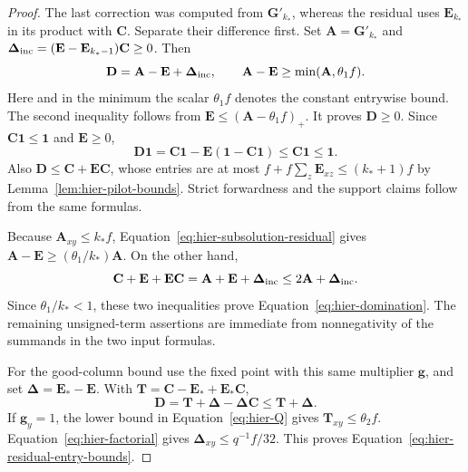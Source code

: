 \documentclass[11pt]{article}
\numberwithin{equation}{section}
\theoremstyle{definition}
\theoremstyle{remark}
\begin{document}
\begin{proof}
The last correction was computed from ${\mathbf{G}}'_{k_*}$, whereas the residual uses ${\mathbf{E}}_{k_*}$ in its product with ${\mathbf{C}}$. Separate their difference first. Set ${\mathbf{A}}={\mathbf{G}}'_{k_*}$ and
$\boldsymbol{\Delta}_{\rm inc}=({\mathbf{E}}-{\mathbf{E}}_{k_*-1}){\mathbf{C}}\geq0$.  Then
\begin{equation}
 {\mathbf{D}}={\mathbf{A}}-{\mathbf{E}}+\boldsymbol{\Delta}_{\rm inc},
 \qquad {\mathbf{A}}-{\mathbf{E}}\geq\min({\mathbf{A}},\theta_1f).
 \label{eq:hier-subsolution-residual}
\end{equation}
Here and in the minimum the scalar $\theta_1f$ denotes the constant
entrywise bound.  The second inequality follows from
${\mathbf{E}}\leq({\mathbf{A}}-\theta_1f)_+$.  It proves ${\mathbf{D}}\geq0$.
Since ${\mathbf{C}}\mathbf 1\leq\mathbf 1$ and ${\mathbf{E}}\geq0$,
\[
 {\mathbf{D}}\mathbf 1={\mathbf{C}}\mathbf 1-{\mathbf{E}}(\mathbf 1-{\mathbf{C}}\mathbf 1)
       \leq {\mathbf{C}}\mathbf 1\leq\mathbf 1.
\]
Also ${\mathbf{D}}\leq {\mathbf{C}}+{\mathbf{E}}{\mathbf{C}}$, whose entries are at most
$f+f\sum_z {\mathbf{E}}_{xz}\leq(k_*+1)f$ by
Lemma~\ref{lem:hier-pilot-bounds}.  Strict forwardness and the support
claims follow from the same formulas.

Because ${\mathbf{A}}_{xy}\leq k_*f$, Equation~\eqref{eq:hier-subsolution-residual}
gives ${\mathbf{A}}-{\mathbf{E}}\geq(\theta_1/k_*){\mathbf{A}}$.  On the other hand,
\[
 {\mathbf{C}}+{\mathbf{E}}+{\mathbf{E}}{\mathbf{C}}={\mathbf{A}}+{\mathbf{E}}+\boldsymbol{\Delta}_{\rm inc}\leq2{\mathbf{A}}+\boldsymbol{\Delta}_{\rm inc}.
\]
Since $\theta_1/k_*<1$, these two inequalities prove
Equation~\eqref{eq:hier-domination}.  The remaining unsigned-term
assertions are immediate from nonnegativity of the summands in the two
input formulas.

For the good-column bound use the fixed point with this same multiplier
${\mathbf{g}}$, and set $\boldsymbol{\Delta}={\mathbf{E}}_*-{\mathbf{E}}$.  With ${\mathbf{T}}={\mathbf{C}}-{\mathbf{E}}_*+{\mathbf{E}}_*{\mathbf{C}}$,
\[
 {\mathbf{D}}={\mathbf{T}}+\boldsymbol{\Delta}-\boldsymbol{\Delta} {\mathbf{C}}\leq {\mathbf{T}}+\boldsymbol{\Delta}.
\]
If ${\mathbf{g}}_{y}=1$, the lower bound in Equation~\eqref{eq:hier-Q} gives
${\mathbf{T}}_{xy}\leq\theta_2f$.  Equation~\eqref{eq:hier-factorial} gives
$\boldsymbol{\Delta}_{xy}\leq q^{-1}f/32$.  This proves
Equation~\eqref{eq:hier-residual-entry-bounds}.
\end{proof}
\end{document}
